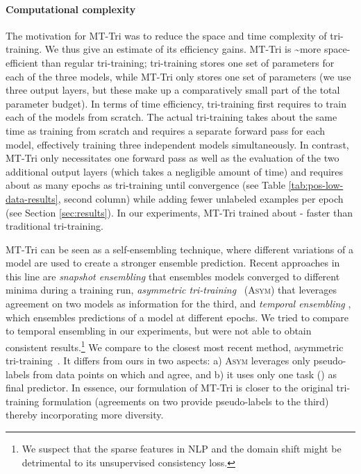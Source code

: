 \documentclass[11pt,a4paper]{article}
\begin{document}
\paragraph{Computational complexity} The motivation for MT-Tri was to reduce the space and time complexity of tri-training. We thus give an estimate of its efficiency gains. MT-Tri is \textasciitilde more space-efficient than regular tri-training; tri-training stores one set of parameters for each of the three models, while MT-Tri only stores one set of parameters (we use three output layers, but these make up a comparatively small part of the total parameter budget). In terms of time efficiency, tri-training first requires to train each of the models from scratch. The actual tri-training takes about the same time as training from scratch and requires a separate forward pass for each model, effectively training three independent models simultaneously. In contrast, MT-Tri only necessitates one forward pass as well as the evaluation of the two additional output layers (which takes a negligible amount of time) and requires about as many epochs as tri-training until convergence (see Table \ref{tab:pos-low-data-results}, second column) while adding fewer unlabeled examples per epoch (see Section \ref{sec:results}). In our experiments, MT-Tri trained about - faster than traditional tri-training.

MT-Tri can be seen as a self-ensembling technique, where different variations of a model are used to create a stronger ensemble prediction. Recent approaches in this line are \textit{snapshot ensembling} \cite{Huang2017c} that ensembles models converged to different minima during a training run, \textit{asymmetric tri-training}~\cite{Saito2017} (\textsc{Asym}) that leverages agreement on two models as information for the third, and \textit{temporal ensembling} \cite{Laine2017}, which ensembles predictions of a model at different epochs. We tried to compare to temporal ensembling in our experiments, but were not able to obtain consistent results.\footnote{We suspect that the sparse features in NLP and the domain shift might be detrimental to its unsupervised consistency loss.} We compare to the closest most recent method, asymmetric tri-training~\cite{Saito2017}. It differs from ours in two aspects: a) \textsc{Asym} leverages only pseudo-labels from data points on which  and  agree, and b) it uses only one task () as final predictor. In essence, our formulation of MT-Tri is closer to the original tri-training formulation (agreements on two provide pseudo-labels to the third) thereby incorporating more diversity.
\end{document}
